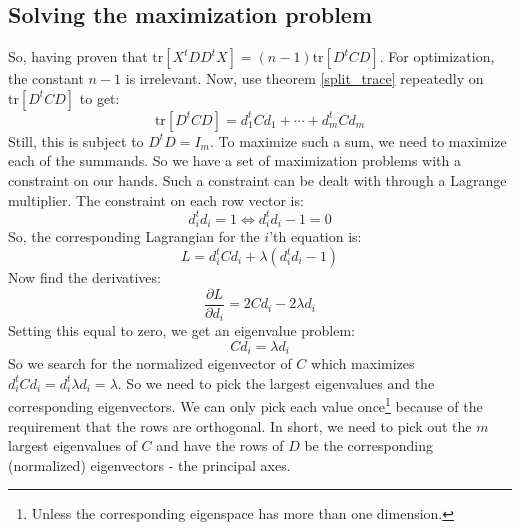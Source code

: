 \documentclass[12pt, a4paper]{article}
\numberwithin{equation}{section}
\begin{document}
\subsection{Solving the maximization problem}
So, having proven that $\textrm{tr}[X^t DD^t X]=(n-1)\textrm{tr}[D^t CD]$. For optimization, the constant $n-1$ is irrelevant. Now, use theorem \ref{split_trace} repeatedly on $\textrm{tr}[D^t CD]$ to get:
\begin{equation}
\textrm{tr}[D^t CD]=d_1^t Cd_1+\cdots +d_m^t Cd_m
\end{equation}
Still, this is subject to $D^t D=I_m$. To maximize such a sum, we need to maximize each of the summands. So we have a set of maximization problems with a constraint on our hands. Such a constraint can be dealt with through a Lagrange multiplier. The constraint on each row vector is:
\begin{equation}
d_i^t d_i=1\Leftrightarrow d_i^t d_i-1=0
\end{equation}
So, the corresponding Lagrangian for the $i$'th equation is:
\begin{equation}
L=d_i^t Cd_i+\lambda(d_i^t d_i-1)
\end{equation}
Now find the derivatives:
\begin{equation}
\frac{\partial L}{\partial d_i}=2Cd_i-2\lambda d_i
\end{equation}
Setting this equal to zero, we get an eigenvalue problem:
\begin{equation}
Cd_i=\lambda d_i
\end{equation}
So we search for the normalized eigenvector of $C$ which maximizes $d_i^t Cd_i=d_i^t\lambda d_i=\lambda$. So we need to pick the largest eigenvalues and the corresponding eigenvectors. We can only pick each value once\footnote{Unless the corresponding eigenspace has more than one dimension.} because of the requirement that the rows are orthogonal. In short, we need to pick out the $m$ largest eigenvalues of $C$ and have the rows of $D$ be the corresponding (normalized) eigenvectors - the principal axes.
\end{document}
